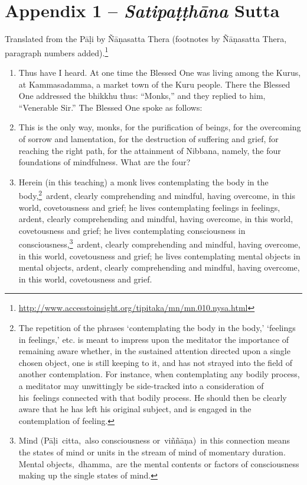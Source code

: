 \section{Appendix 1 -- \textit{Satipaṭṭhāna} Sutta}

Translated from the Pāḷi by Ñāṇasatta Thera (footnotes by Ñāṇasatta Thera, paragraph numbers added).\footnote{\url{http://www.accesstoinsight.org/tipitaka/mn/mn.010.nysa.html}}

\begin{enumerate}
\item Thus have I heard. At one time the Blessed One was living among the Kurus, at Kammasadamma, a market town of the Kuru people. There the Blessed One addressed the bhikkhu thus: ``Monks,” and they replied to him, ``Venerable Sir.” The Blessed One spoke as follows:
\item This is the only way, monks, for the purification of beings, for the overcoming of sorrow and lamentation, for the destruction of suffering and grief, for reaching the right path, for the attainment of Nibbana, namely, the four foundations of mindfulness. What are the four?
\item Herein (in this teaching) a monk lives contemplating the body in the body,\footnote{The repetition of the phrases ‘contemplating the body in the body,’ ‘feelings in feelings,’ etc. is meant to impress upon the meditator the importance of remaining aware whether, in the sustained attention directed upon a single chosen object, one is still keeping to it, and has not strayed into the field of another contemplation. For instance, when contemplating any bodily process, a meditator may unwittingly be side-tracked into a consideration of his feelings connected with that bodily process. He should then be clearly aware that he has left his original subject, and is engaged in the contemplation of feeling.} ardent, clearly comprehending and mindful, having overcome, in this world, covetousness and grief; he lives contemplating feelings in feelings, ardent, clearly comprehending and mindful, having overcome, in this world, covetousness and grief; he lives contemplating consciousness in consciousness,\footnote{Mind (Pāḷi citta, also consciousness or viññāṇa) in this connection means the states of mind or units in the stream of mind of momentary duration. Mental objects, dhamma, are the mental contents or factors of consciousness making up the single states of mind.} ardent, clearly comprehending and mindful, having overcome, in this world, covetousness and grief; he lives contemplating mental objects in mental objects, ardent, clearly comprehending and mindful, having overcome, in this world, covetousness and grief.
\end{enumerate}

